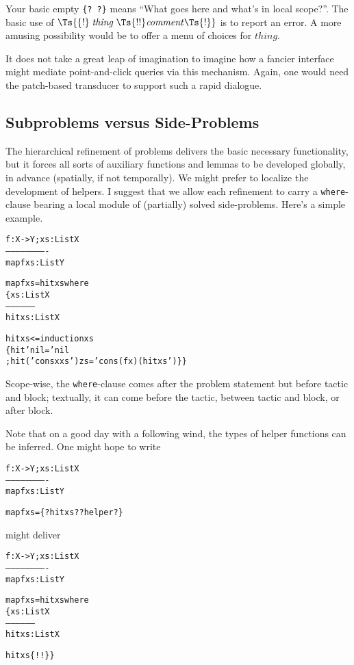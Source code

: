 \documentclass{article}
\begin{document}
Your basic empty \texttt{\{? ?\}} means
``What goes here and what's in local scope?''. The basic use of
\(\Ts{\{!}\; \mathit{thing}\; \Ts{!!} \mathit{comment} \Ts{!\}}\)
is to report an error. A more amusing possibility would be to offer
a menu of choices for \(\mathit{thing}\).

It does not take a great leap of imagination to imagine how a fancier
interface might mediate point-and-click queries via this mechanism.
Again, one would need the patch-based transducer to support such a
rapid dialogue.


\subsection{Subproblems versus Side-Problems}

The hierarchical refinement of problems delivers the basic necessary
functionality, but it forces all sorts of auxiliary functions and lemmas
to be developed globally, in advance (spatially, if not temporally).
We might prefer to localize the development of helpers. I suggest that
we allow each refinement to carry a \texttt{where}-clause bearing a local
module of (partially) solved side-problems. Here's a simple example.

\begin{alltt}
 f : X -> Y; xs : List X
-------------------------
 map f xs : List Y

map f xs = hit xs where
\{  xs : List X
  -----------------
   hit xs : List X

  hit xs <= induction xs
  \{ hit 'nil = 'nil
  ; hit ('cons x xs') zs = 'cons (f x) (hit xs') \}\}
\end{alltt}

Scope-wise, the \texttt{where}-clause comes after the problem statement
but before tactic and block; textually, it can come before the tactic,
between tactic and block, or after block.

Note that on a good day with a following wind, the types of helper
functions can be inferred. One might hope to write
\begin{alltt}
 f : X -> Y; xs : List X
-------------------------
 map f xs : List Y

map f xs = \{? hit xs ?? helper ?\}
\end{alltt}
might deliver
\begin{alltt}
 f : X -> Y; xs : List X
-------------------------
 map f xs : List Y

map f xs = hit xs where
\{  xs : List X
  -----------------
   hit xs : List X

  hit xs \{! !\} \}
\end{alltt}
\end{document}
